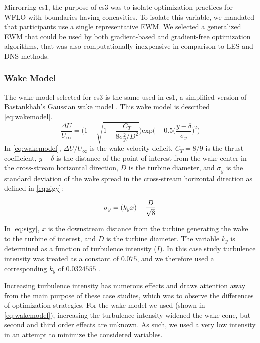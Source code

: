 Mirrorring cs1, the purpose of cs3 was to isolate optimization practices for WFLO with boundaries having concavities.
To isolate this variable, we mandated that participants use a single representative EWM.
We selected a generalized EWM that could be used by both gradient-based and gradient-free optimization algorithms, that was also computationally inexpensive in comparison to LES and DNS methods.
    
    \subsubsection{Wake Model} \label{sec:wakemodel}
        The wake model selected for cs3 is the same used in cs1, a simplified version of Bastankhah's Gaussian wake model \cite{Bastankhah2016,ThomasNing2018}.
        This wake model is described \cref{eq:wakemodel}.
%
        \begin{equation}
            \frac{\Delta U}{U_{\infty}}
            =
            \Bigg(
            1 - \sqrt{
                1 - \frac{C_T}
                {8\sigma_{y}^{2}/D^2}
            }
            \Bigg)
            \text{exp}\bigg(
            -0.5\Big(
                \frac{y-\delta}{\sigma_{y}}
                \Big)^2
            \bigg)
            \label{eq:wakemodel}
        \end{equation}
%
        In \cref{eq:wakemodel}, $\Delta U/U_{\infty}$ is the wake velocity deficit, $C_T = 8/9$ is the thrust coefficient, $y-\delta$ is the distance of the point of interest from the wake center in the cross-stream horizontal direction, $D$ is the turbine diameter, and $\sigma_y$ is the standard deviation of the wake spread in the cross-stream horizontal direction as defined in \cref{eq:sigy}:

        \begin{equation}
            \sigma_y = (k_y x) + \frac{D}{\sqrt{8}} \\
            \label{eq:sigy}
        \end{equation}

        In \cref{eq:sigy}, $x$ is the downstream distance from the turbine generating the wake to the turbine of interest, and $D$ is the turbine diameter. The variable $k_y$ is determined as a function of turbulence intensity ($I$).
        In this case study turbulence intensity was treated as a constant of $0.075$, and we therefore used a corresponding $k_{y}$ of $0.0324555$ \cite{Niayifar2016,ThomasNing2018}.

        Increasing turbulence intensity has numerous effects and draws attention away from the main purpose of these case studies, which was to observe the differences of optimization strategies.
        For the wake model we used (shown in \cref{eq:wakemodel}), increasing the turbulence intensity widened the wake cone, but second and third order effects are unknown.
        As such, we used a very low intensity in an attempt to minimize the considered variables.

